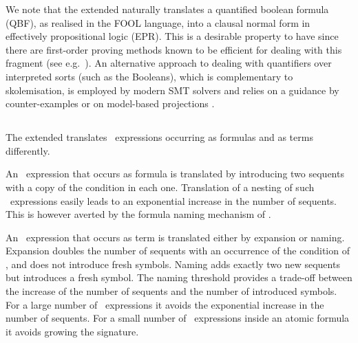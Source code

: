 We note that the extended \newcnf{} naturally translates a quantified boolean formula (QBF),
as realised in the FOOL language, into a clausal normal form in effectively propositional logic (EPR). 
This is a desirable property to have since there are first-order proving methods 
known to be efficient for dealing with this fragment (see e.g.~\cite{DBLP:conf/birthday/Korovin13}).
An alternative approach to dealing with quantifiers over interpreted sorts (such as the Booleans), 
which is complementary to skolemisation,
is employed by modern SMT solvers and relies on a guidance by counter-examples 
\cite{DBLP:journals/corr/Reynolds0K15} or on model-based projections \cite{LPAR-20:Playing_with_Quantified_Satisfaction}.


\subsection{\ITE}
The extended \newcnf{} translates \ITE\ expressions occurring as formulas and as terms differently.

An \ITE\ expression that occurs as formula is translated by introducing two sequents with a copy of the condition in each one. Translation of a nesting of such \ITE\ expressions easily leads to an exponential increase in the number of sequents. This is however averted by the formula naming mechanism of \newcnf{}.

An \ITE\ expression that occurs as term is translated either by expansion or naming. Expansion doubles the number of sequents with an occurrence of the condition of \ITE, and does not introduce fresh symbols. Naming adds exactly two new sequents but introduces a fresh symbol. The naming threshold provides a trade-off between the increase of the number of sequents and the number of introduced symbols. For a large number of \ITE\ expressions it avoids the exponential increase in the number of sequents. For a small number of \ITE\ expressions inside an atomic formula it avoids growing the signature.

